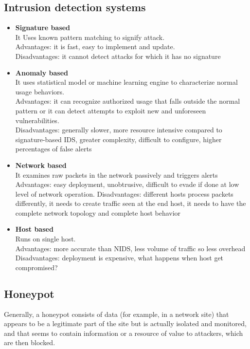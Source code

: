 \documentclass[10pt,a4paper]{book}
\begin{document}
\subsection{Intrusion detection systems}
\begin{itemize}
\item \textbf{Signature based}\\
It Uses known pattern matching to signify attack.\\
Advantages: it is fast, easy to implement and update.\\ 
Disadvantages: it cannot detect attacks for which it has no signature
\item \textbf{Anomaly based}\\
It uses statistical model or machine learning engine to characterize normal usage behaviors.\\
Advantages: it can recognize authorized usage that falls outside the normal pattern or it can detect attempts to exploit new and unforeseen vulnerabilities.\\
Disadvantages: generally slower, more resource intensive compared to signature-based IDS, greater complexity, difficult to configure, higher percentages of false alerts
\item \textbf{Network based}\\
It examines raw packets in the network passively and triggers alerts\\
Advantages: easy deployment, unobtrusive, difficult to evade if done at low level of network operation.
Disadvantages: different hosts process packets differently, it needs to create traffic seen at the end
host, it needs to have the complete network topology and complete host behavior
\item \textbf{Host based}\\
Runs on single host.\\
Advantages: more accurate than NIDS, less volume of traffic so less overhead\\
Disadvantages: deployment is expensive, what happens when host get compromised?
\end{itemize}
\subsection{Honeypot}
Generally, a honeypot consists of data (for example, in a network site) that appears to be a legitimate part of the site but is actually isolated and monitored, and that seems to contain information or a resource of value to attackers, which are then blocked. 
\end{document}
